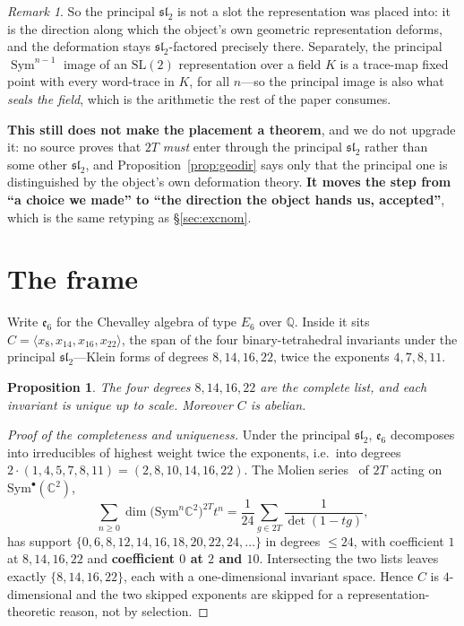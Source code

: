 \documentclass[11pt,reqno]{amsart}
\theoremstyle{plain}
\newtheorem{proposition}[theorem]{Proposition}
\theoremstyle{definition}
\theoremstyle{remark}
\newtheorem{remark}[theorem]{Remark}
\newcommand{\Q}{\mathbb{Q}}
\newcommand{\C}{\mathbb{C}}
\newcommand{\SL}{\mathrm{SL}}
\newcommand{\sll}{\mathfrak{sl}}
\newcommand{\ee}{\mathfrak{e}}
\newcommand{\Sym}{\operatorname{Sym}}
\begin{document}
\begin{remark}
So the principal $\sll_2$ is not a slot the representation was placed into: it is the
direction along which the object's own geometric representation deforms, and the
deformation stays $\sll_2$-factored precisely there. Separately, the principal
$\Sym^{n-1}$ image of an $\SL(2)$ representation over a field $K$ is a trace-map fixed
point with every word-trace in $K$, for all $n$---so the principal image is also what
\emph{seals the field}, which is the arithmetic the rest of the paper consumes.

\textbf{This still does not make the placement a theorem}, and we do not upgrade it: no
source proves that $2T$ \emph{must} enter through the principal $\sll_2$ rather than
some other $\sll_2$, and Proposition~\ref{prop:geodir} says only that the principal one
is distinguished by the object's own deformation theory. \textbf{It moves the step from
``a choice we made'' to ``the direction the object hands us, accepted''}, which is the
same retyping as \S\ref{sec:excnom}.
\end{remark}

\section{The frame}\label{sec:frame}

Write $\ee_6$ for the Chevalley algebra of type $E_6$ over $\Q$. Inside it sits
$C=\langle x_8,x_{14},x_{16},x_{22}\rangle$, the span of the four binary-tetrahedral
invariants under the principal $\sll_2$---Klein forms of degrees $8,14,16,22$, twice the
exponents $4,7,8,11$.

\begin{proposition}\label{prop:C}
The four degrees $8,14,16,22$ are the complete list, and each invariant is unique up to
scale. Moreover $C$ is abelian.
\end{proposition}

\begin{proof}[Proof of the completeness and uniqueness]
Under the principal $\sll_2$, $\ee_6$ decomposes into irreducibles of highest weight
twice the exponents, i.e.\ into degrees $2\cdot(1,4,5,7,8,11)=(2,8,10,14,16,22)$. The
Molien series~\cite{Molien} of $2T$ acting on $\mathrm{Sym}^\bullet(\C^2)$,
\[
   \sum_{n\ge0}\dim\bigl(\mathrm{Sym}^n\C^2\bigr)^{2T}t^n
   =\frac{1}{24}\sum_{g\in 2T}\frac{1}{\det(1-tg)},
\]
has support $\{0,6,8,12,14,16,18,20,22,24,\dots\}$ in degrees $\le24$, with
coefficient $1$ at $8,14,16,22$ and \textbf{coefficient $0$ at $2$ and $10$}.
Intersecting the two lists leaves exactly $\{8,14,16,22\}$, each with a
one-dimensional invariant space. Hence $C$ is $4$-dimensional and the two skipped
exponents are skipped for a representation-theoretic reason, not by selection.
\end{proof}
\end{document}
